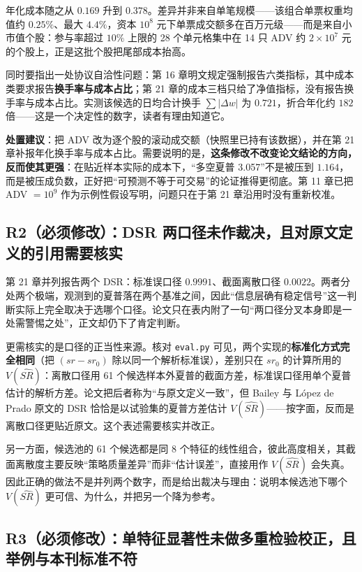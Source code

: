 \documentclass[11pt,a4paper]{ctexart}
\begin{document}
年化成本随之从 $0.169$ 升到 $0.378$。差异并非来自单笔规模——该组合单票权重均值约 $0.25\%$、最大 $4.4\%$，资本 $10^8$ 元下单票成交额多在百万元级——而是来自小市值个股：参与率超过 $10\%$ 上限的 28 个单元格集中在 14 只 ADV 约 $2\times10^7$ 元的个股上，正是这批个股把尾部成本抬高。

同时要指出一处协议自洽性问题：第 16 章明文规定强制报告六类指标，其中成本类要求报告\textbf{换手率与成本占比}；第 21 章的成本三档只给了净值指标，没有报告换手率与成本占比。实测该候选的日均合计换手 $\sum|\Delta w|$ 为 $0.721$，折合年化约 $182$ 倍——这是一个决定性的数字，读者有理由知道它。

\textbf{处置建议}：把 ADV 改为逐个股的滚动成交额（快照里已持有该数据），并在第 21 章补报年化换手率与成本占比。需要说明的是，\textbf{这条修改不改变论文结论的方向，反而使其更强}：在贴近样本实际的成本下，“多空夏普 3.057”不是被压到 $1.164$，而是被压成负数，正好把“可预测不等于可交易”的论证推得更彻底。第 11 章已把 ADV $=10^9$ 作为示例性假设写明，问题只在于第 21 章沿用时没有重新校准。

\subsection{R2（必须修改）：DSR 两口径未作裁决，且对原文定义的引用需要核实}

第 21 章并列报告两个 DSR：标准误口径 $0.9991$、截面离散口径 $0.0022$。两者分处两个极端，观测到的夏普落在两个基准之间，因此“信息层确有稳定信号”这一判断实际上完全取决于选哪个口径。论文只在表内附了一句“两口径分叉本身即是一处需警惕之处”，正文却仍下了肯定判断。

更需核实的是口径的正当性来源。核对 \texttt{eval.py} 可见，两个实现的\textbf{标准化方式完全相同}（把 $(sr-sr_0)$ 除以同一个解析标准误），差别只在 $sr_0$ 的计算所用的 $V(\widehat{SR})$：离散口径用 61 个候选样本外夏普的截面方差，标准误口径用单个夏普估计的解析方差。论文把后者称为“与原文定义一致”，但 Bailey 与 López de Prado 原文的 DSR 恰恰是以试验集的夏普方差估计 $V(\widehat{SR})$——按字面，反而是离散口径更贴近原文。这个表述需要核实并改正。

另一方面，候选池的 61 个候选都是同 8 个特征的线性组合，彼此高度相关，其截面离散度主要反映“策略质量差异”而非“估计误差”，直接用作 $V(\widehat{SR})$ 会失真。因此正确的做法不是并列两个数字，而是给出裁决与理由：说明本候选池下哪个 $V(\widehat{SR})$ 更可信、为什么，并把另一个降为参考。

\subsection{R3（必须修改）：单特征显著性未做多重检验校正，且举例与本刊标准不符}
\end{document}
